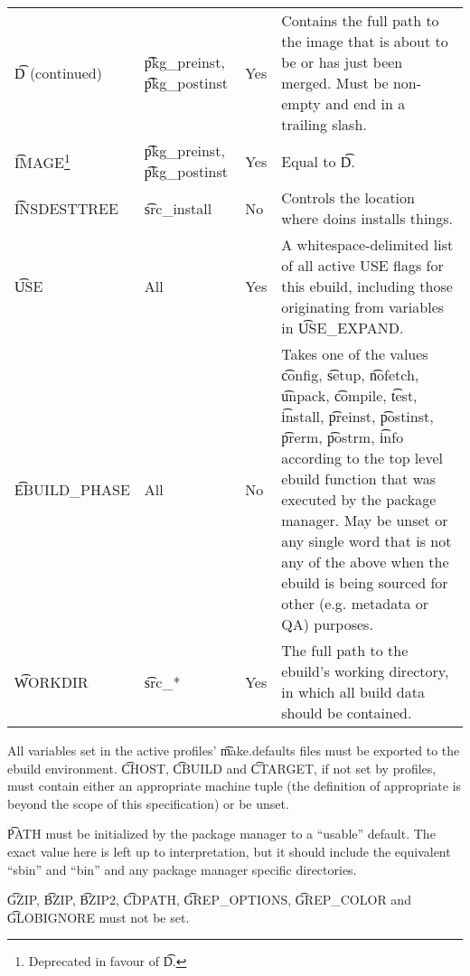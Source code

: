 \begin{longtable}{l p{} l p{}}
\t{D} (continued) &
    \t{pkg\_preinst}, \t{pkg\_postinst} &
    Yes &
    Contains the full path to the image that is about to be or has just been merged. Must be
    non-empty and end in a trailing slash. \\
\t{IMAGE}\footnote{Deprecated in favour of \t{D}.} &
    \t{pkg\_preinst}, \t{pkg\_postinst} &
    Yes &
    Equal to \t{D}. \\
\t{INSDESTTREE} &
    \t{src\_install} &
    No &
    Controls the location where doins installs things. \\
\t{USE} &
    All &
    Yes &
    A whitespace-delimited list of all active USE flags for this ebuild, including those
    originating from variables in \t{USE\_EXPAND}. \\
\t{EBUILD\_PHASE} &
    All &
    No &
    Takes one of the values \t{config}, \t{setup}, \t{nofetch}, \t{unpack},
    \t{compile}, \t{test}, \t{install}, \t{preinst}, \t{postinst}, \t{prerm}, \t{postrm}, \t{info}
    according to the top level ebuild function that was executed by the package manager. May be
    unset or any single word that is not any of the above when the ebuild is being sourced for
    other (e.g. metadata or QA) purposes. \\
\t{WORKDIR} &
    \t{src\_*} &
    Yes &
    The full path to the ebuild's working directory, in which all build data should be
    contained. \label{env-var-WORKDIR} \\
\end{longtable}

All variables set in the active profiles' \t{make.defaults} files must be exported to the ebuild
environment. \t{CHOST}, \t{CBUILD} and \t{CTARGET}, if not set by profiles, must contain either an
appropriate machine tuple (the definition of appropriate is beyond the scope of this specification)
or be unset.

\t{PATH} must be initialized by the package manager to a ``usable'' default.  The exact value here
is left up to interpretation, but it should include the equivalent ``sbin'' and ``bin'' and any
package manager specific directories.

\t{GZIP}, \t{BZIP}, \t{BZIP2}, \t{CDPATH}, \t{GREP\_OPTIONS}, \t{GREP\_COLOR} and \t{GLOBIGNORE}
must not be set.


